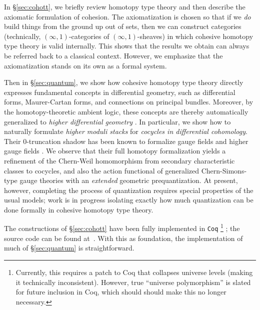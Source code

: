 \documentclass[copyright,12pt]{eptcs}
\newcommand{\io}{\ensuremath{(\infty,1)}}
\begin{document}

\vspace{.2cm}

In \S\ref{sec:cohott}, we briefly review homotopy type theory and then describe the axiomatic formulation of cohesion.
The axiomatization is chosen so that if we \emph{do} build things from the ground up out of sets, then we can construct categories (technically, \io-categories of \io-sheaves) in which cohesive homotopy type theory is valid internally.
This shows that the results we obtain can always be referred back to a classical context.
However, we emphasize that the axiomatization stands on its own as a formal system.

Then in \S\ref{sec:quantum}, we show how cohesive homotopy type theory directly expresses
fundamental concepts in differential geometry, such as differential forms,
Maurer-Cartan forms, and connections on principal bundles.
Moreover, by the homotopy-theoretic ambient logic, these concepts are thereby automatically generalized to
\emph{higher differential geometry} \cite{NSS}. In particular,
we show how to naturally formulate
\emph{higher moduli stacks} for \emph{cocycles in differential cohomology}.
Their 0-truncation shadow has been known to
formalize gauge fields and higher gauge fields \cite{Freed}.
We observe that their full homotopy formalization yields a refinement of
the Chern-Weil homomorphism from secondary characteristic classes to
cocycles, and also the action functional of generalized
Chern-Simons-type gauge theories with an \emph{extended} geometric prequantization.
At present, however, completing the process of quantization requires special properties of the usual models; work is in progress isolating exactly how much quantization can be done formally in cohesive homotopy type theory.

The constructions of \S\ref{sec:cohott} have been fully implemented in {\tt Coq}%
\footnote{Currently, this requires a patch to Coq that collapses universe levels (making it technically inconsistent).  However, true ``universe polymorphism'' is slated for future inclusion in Coq, which should should make this no longer necessary.} \cite{Coq};
the source code can be found at~\cite{CohesiveCoq}.  With this as foundation, the implementation
of much of \S\ref{sec:quantum} is straightforward.
\end{document}
